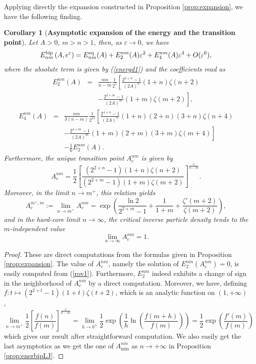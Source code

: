 \documentclass[12pt]{iopart}
\newtheorem{corollary}[thm]{Corollary}
\theoremstyle{definition}
\begin{document}
Applying directly the expansion constructed in Proposition
\ref{prop:expansion}, we have the following finding.
\begin{corollary}[\textbf{Asymptotic expansion of the energy and the transition point}]
Let $A>0$, $m>n>1$, then, as $\varepsilon\to 0$, we have
\begin{equation} \label{trans}
E_{nm}^{\rm bip}\left( A,e^{\varepsilon}\right) = E_{nm}^{\rm eq}(A)
+ E_2^{nm}(A) \varepsilon^2 + E_4^{nm}(A) \varepsilon^4 + O(\varepsilon^6), 
\end{equation}
where the absolute term is given by (\ref{energd1}) and the coefficients
read as
\begin{eqnarray}
E_2^{nm}(A) & = & \frac{n m}{n-m} \frac{1}{2^5} \left[
\frac{2^{2+n}-1}{(2A)^n} (1+n) \zeta(n+2) \right. \nonumber \\
& & \left. - \frac{2^{2+m}-1}{(2A)^m} (1+m) \zeta(m+2) \right] , \label{rov1}
\end{eqnarray}
\begin{eqnarray}
E_4^{nm}(A) & = & \frac{n m}{3(n-m)} \frac{1}{2^{11}} \left[
\frac{2^{4+n}-1}{(2A)^n} (1+n) (2+n) (3+n) \zeta(n+4) \right. \nonumber \\
& & \left.  - \frac{2^{4+m}-1}{(2A)^m} (1+m) (2+m) (3+m) \zeta(m+4) \right]
\nonumber \\ & & - \frac{1}{6} E_2^{nm}(A). \label{rov2}
\end{eqnarray}  
Furthermore, the unique transition point $A_c^{nm}$ is given by
\begin{equation} \label{astar}
A_c^{nm} = \frac{1}{2} 
\left[ \frac{(2^{2+n}-1)(1+n)\zeta(n+2)}{(2^{2+m}-1)(1+m)\zeta(m+2)}
\right]^{\frac{1}{n-m}} .  
\end{equation} 
Moreover, in the limit $n\to m^+$, this relation yields
\begin{equation}
A_c^{m^+,m}:=\lim_{n\to m^+} A_c^{nm}=\exp\left( \frac{\ln 2}{2^{2+m}-1}+\frac{1}{1+m}
+\frac{\zeta'(m+2)}{\zeta(m+2)} \right),
\end{equation}
and in the hard-core limit $n\to\infty$, the critical inverse particle density
tends to the $m$-independent value
\begin{equation}
\lim_{n\to\infty} A_c^{nm} = 1.
\end{equation}  
\end{corollary}
\begin{proof}
These are direct computations from the formulas given in Proposition
\ref{prop:expansion}.
The value of $A_c^{nm}$, namely the solution of $E_2^{nm}(A_c^{nm})=0$,
is easily computed from (\ref{rov1}).
Furthermore, $E_2^{nm}$ indeed exhibits a change of sign in the neighborhood
of $A_c^{nm}$ by a direct computation.
Moreover, we have, defining $f:t\mapsto (2^{2+t}-1)(1+t)\zeta(t+2)$,
which is an analytic function on $(1,+\infty)$,
$$
\lim_{n\to m^+} \frac{1}{2}\left[ \frac{f(n)}{f(m)} \right]^{\frac{1}{n-m}}
= \lim_{h\to 0^+} \frac{1}{2}\exp\left(\frac{1}{h}\ln\left(\frac{f(m+h)}{f(m)}
\right) \right) = \frac{1}{2}\exp\left(\frac{f'(m)}{f(m)} \right)
$$
which gives our result after straightforward computation.
We also easily get the last asymptotics as we get the one of $A_{\min}^{nm}$
as $n\to +\infty$ in Proposition \ref{prop:enerbipLJ}.
\end{proof}
\end{document}
